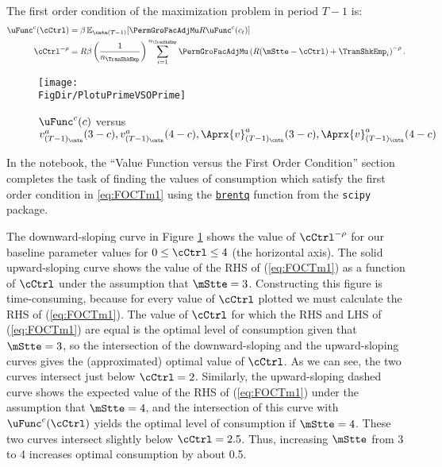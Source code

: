 \documentclass[titlepage, headings=optiontotocandhead]{Resources/texmf-local/tex/latex/econtex}
\begin{document}
The first order condition of the maximization problem in period $T-1$ is:
  \begin{equation}\begin{gathered}\begin{aligned}
        \uFunc^{c}(\cCtrl)       & = \beta \Ex_{\cntn(T-1)} [\PermGroFacAdjMu R \uFunc^{c}(c_{t})]  %
        \\      \cCtrl^{-\rho}   & = R \beta \left(\frac{1}{n_{\TranShkEmp}}\right) \sum_{i=1}^{n_{\TranShkEmp}} \PermGroFacAdjMu\left(R (\mStte-\cCtrl) + \TranShkEmp_{i}\right)^{-\rho} \label{eq:FOCTm1}.
      \end{aligned}\end{gathered}\end{equation}
\hypertarget{PlotuPrimeVSOPrime}{}
\begin{figure}
  \centerline{\texttt{[image: \\FigDir/PlotuPrimeVSOPrime]}}
  \caption{$\uFunc^{c}(c)$ versus $v_{({T-1})_\cntn}^{a}(3-c), v_{({T-1})_\cntn}^{a}(4-c), \Aprx{v}_{({T-1})_\cntn}^{a}(3-c), \Aprx{v}_{({T-1})_\cntn}^{a}(4-c)$}
  \label{fig:PlotuPrimeVSOPrime}
\end{figure}

In the notebook, the ``Value Function versus the First Order Condition'' section completes the task of finding the values of consumption which satisfy the first order condition in \eqref{eq:FOCTm1} using the \href{https://docs.scipy.org/doc/scipy/reference/generated/scipy.optimize.brentq.html}{\texttt{brentq}} function from the \texttt{scipy} package. %

The downward-sloping curve in Figure \ref{fig:PlotuPrimeVSOPrime}
shows the value of $\cCtrl^{-\rho}$ for our baseline parameter values
for $0 \leq \cCtrl \leq 4$ (the horizontal axis).  The solid
upward-sloping curve shows the value of the RHS of (\ref{eq:FOCTm1})
as a function of $\cCtrl$ under the assumption that $\mStte=3$.
Constructing this figure is time-consuming, because for every
value of $\cCtrl$ plotted we must calculate the RHS of
(\ref{eq:FOCTm1}).  The value of $\cCtrl$ for which the RHS and LHS
of (\ref{eq:FOCTm1}) are equal is the optimal level of consumption
given that $\mStte=3$, so the intersection of the downward-sloping
and the upward-sloping curves gives the (approximated) optimal value of $\cCtrl$.
As we can see, the two curves intersect just below $\cCtrl=2$.
Similarly, the upward-sloping dashed curve shows the expected value
of the RHS of (\ref{eq:FOCTm1}) under the assumption that $\mStte=4$,
and the intersection of this curve with $\uFunc^{c}(\cCtrl)$ yields the
optimal level of consumption if $\mStte=4$.  These two curves
intersect slightly below $\cCtrl=2.5$.  Thus, increasing $\mStte$
from 3 to 4 increases optimal consumption by about 0.5.
\end{document}
